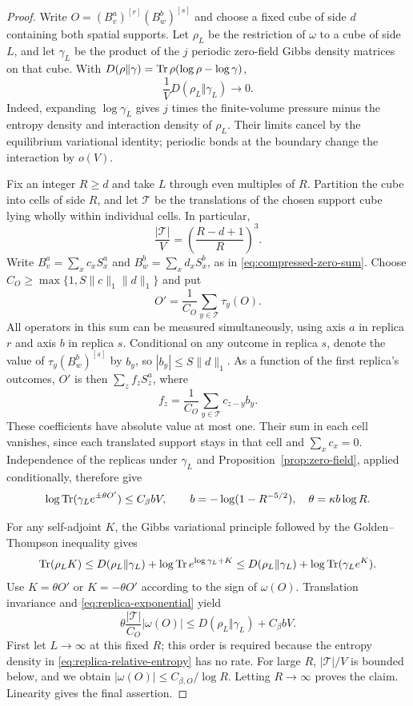 \begin{proof}
Write $O=(B_v^a)^{[r]}(B_w^b)^{[s]}$ and choose a fixed cube of side
$d$ containing both spatial supports.  Let $\rho_L$ be the restriction
of $\omega$ to a cube of side $L$, and let $\gamma_L$ be the product
of the $j$ periodic zero-field Gibbs density matrices on that cube.
With $D(\rho\Vert\gamma)=\operatorname{Tr}\rho(\log\rho-\log\gamma)$,
\begin{equation}\label{eq:replica-relative-entropy}
 \frac1V D(\rho_L\Vert\gamma_L)\longrightarrow0.
\end{equation}
Indeed, expanding $\log\gamma_L$ gives $j$ times the finite-volume
pressure minus the entropy density and interaction density of
$\rho_L$.  Their limits cancel by the equilibrium variational identity;
periodic bonds at the boundary change the interaction by $o(V)$.

Fix an integer $R\ge d$ and take $L$ through even multiples of $R$.
Partition the cube into cells of side $R$, and let $\mathcal T$ be the
translations of the chosen support cube lying wholly within individual
cells.  In particular,
\[
 \frac{|\mathcal T|}{V}
       =\left(\frac{R-d+1}{R}\right)^3.
\]
Write $B_v^a=\sum_xc_xS_x^a$ and $B_w^b=\sum_xd_xS_x^b$, as in
\eqref{eq:compressed-zero-sum}.  Choose
$C_O\ge\max\{1,S\|c\|_1\|d\|_1\}$ and put
\[
 O'=\frac1{C_O}\sum_{y\in\mathcal T}\tau_y(O).
\]
All operators in this sum can be measured simultaneously, using axis
$a$ in replica $r$ and axis $b$ in replica $s$.  Conditional on any
outcome in replica $s$, denote the value of
$\tau_y(B_w^b)^{[s]}$ by $b_y$, so $|b_y|\le S\|d\|_1$.
As a function of the first replica's outcomes, $O'$ is then
$\sum_z f_zS_z^a$, where
\[
 f_z=\frac1{C_O}\sum_{y\in\mathcal T}c_{z-y}b_y.
\]
These coefficients have absolute value at most one.  Their sum in each
cell vanishes, since each translated support stays in that cell and
$\sum_xc_x=0$.  Independence of the replicas under $\gamma_L$ and
Proposition~\ref{prop:zero-field}, applied conditionally, therefore give
\begin{equation}\label{eq:replica-exponential}
 \log\operatorname{Tr}(\gamma_Le^{\pm\theta O'})\le C_\beta bV,
 \qquad
 b=-\log(1-R^{-5/2}),\quad\theta=\kappa b\log R.
\end{equation}

For any self-adjoint $K$, the Gibbs variational principle followed by
the Golden--Thompson inequality \cite{Golden1965,Thompson1965} gives
\[
 \operatorname{Tr}(\rho_LK)
 \le D(\rho_L\Vert\gamma_L)
       +\log\operatorname{Tr} e^{\log\gamma_L+K}
 \le D(\rho_L\Vert\gamma_L)+\log\operatorname{Tr}(\gamma_Le^K).
\]
Use $K=\theta O'$ or $K=-\theta O'$ according to the sign of
$\omega(O)$.  Translation invariance and
\eqref{eq:replica-exponential} yield
\[
 \theta\frac{|\mathcal T|}{C_O}|\omega(O)|
 \le D(\rho_L\Vert\gamma_L)+C_\beta bV.
\]
First let $L\to\infty$ at this fixed $R$; this order is required because
the entropy density in \eqref{eq:replica-relative-entropy} has no rate.
For large $R$, $|\mathcal T|/V$ is bounded below, and we obtain
$|\omega(O)|\le C_{\beta,O}/\log R$.  Letting $R\to\infty$ proves the
claim.  Linearity gives the final assertion.
\end{proof}

